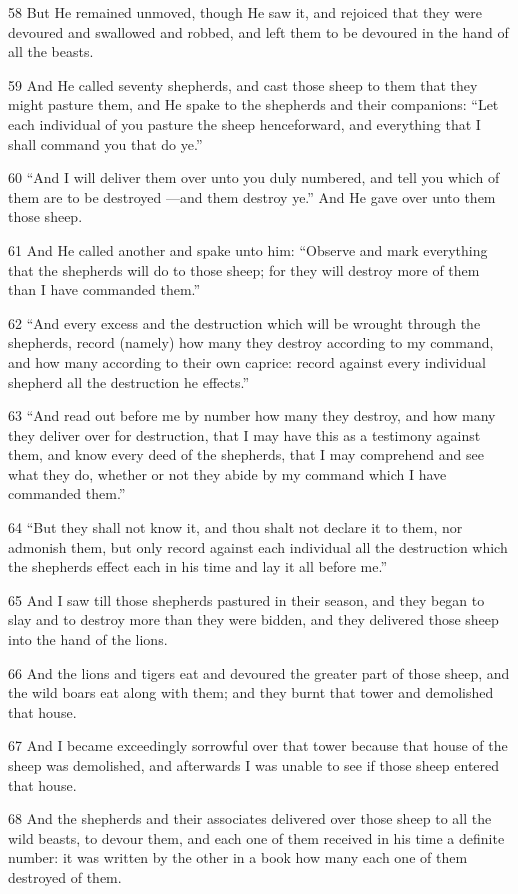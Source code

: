 \par 58 But He remained unmoved, though He saw it, and rejoiced that they were devoured and swallowed and robbed, and left them to be devoured in the hand of all the beasts.
\par 59 And He called seventy shepherds, and cast those sheep to them that they might pasture them, and He spake to the shepherds and their companions: “Let each individual of you pasture the sheep henceforward, and everything that I shall command you that do ye.”
\par 60 “And I will deliver them over unto you duly numbered, and tell you which of them are to be destroyed —and them destroy ye.” And He gave over unto them those sheep.
\par 61 And He called another and spake unto him: “Observe and mark everything that the shepherds will do to those sheep; for they will destroy more of them than I have commanded them.”
\par 62 “And every excess and the destruction which will be wrought through the shepherds, record (namely) how many they destroy according to my command, and how many according to their own caprice: record against every individual shepherd all the destruction he effects.”
\par 63 “And read out before me by number how many they destroy, and how many they deliver over for destruction, that I may have this as a testimony against them, and know every deed of the shepherds, that I may comprehend and see what they do, whether or not they abide by my command which I have commanded them.”
\par 64 “But they shall not know it, and thou shalt not declare it to them, nor admonish them, but only record against each individual all the destruction which the shepherds effect each in his time and lay it all before me.”
\par 65 And I saw till those shepherds pastured in their season, and they began to slay and to destroy more than they were bidden, and they delivered those sheep into the hand of the lions.
\par 66 And the lions and tigers eat and devoured the greater part of those sheep, and the wild boars eat along with them; and they burnt that tower and demolished that house.
\par 67 And I became exceedingly sorrowful over that tower because that house of the sheep was demolished, and afterwards I was unable to see if those sheep entered that house.
\par 68 And the shepherds and their associates delivered over those sheep to all the wild beasts, to devour them, and each one of them received in his time a definite number: it was written by the other in a book how many each one of them destroyed of them.
